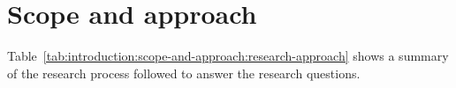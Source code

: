 \section[Scope\& approach]{Scope and approach}
\label{sec:ch-intro:approach}


Table~\ref{tab:introduction:scope-and-approach:research-approach} shows a summary of the research process followed to answer the research questions.

\tablespacing

\bodyspacing